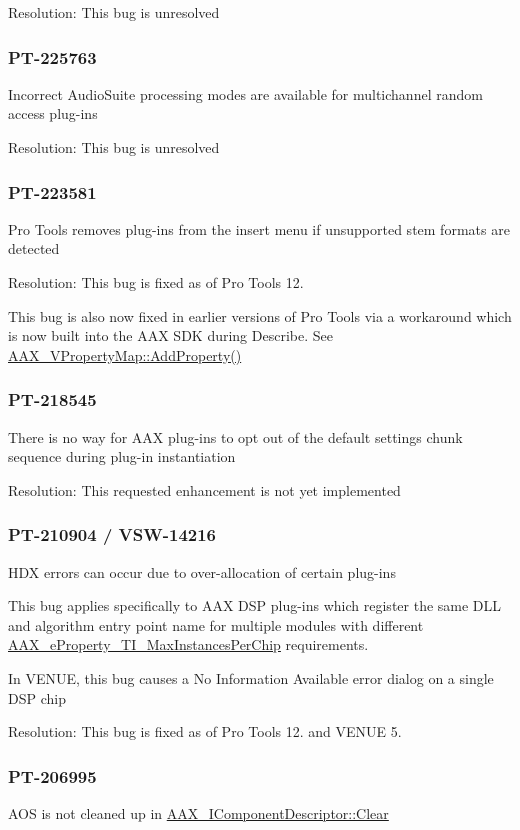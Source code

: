 Resolution\+: This bug is unresolved\hypertarget{a00374_PT-225763}{}\subsubsection{P\+T-\/225763}\label{a00374_PT-225763}
Incorrect Audio\+Suite processing modes are available for multichannel random access plug-\/ins

Resolution\+: This bug is unresolved\hypertarget{a00374_PT-223581}{}\subsubsection{P\+T-\/223581}\label{a00374_PT-223581}
Pro Tools removes plug-\/ins from the insert menu if unsupported stem formats are detected

Resolution\+: This bug is fixed as of Pro Tools 12.

This bug is also now fixed in earlier versions of Pro Tools via a workaround which is now built into the A\+A\+X S\+D\+K during Describe. See \hyperlink{a00140_ad66bb0c14572a6d550d7774a4d50ec38}{A\+A\+X\+\_\+\+V\+Property\+Map\+::\+Add\+Property()}\hypertarget{a00374_PT-218545}{}\subsubsection{P\+T-\/218545}\label{a00374_PT-218545}
There is no way for A\+A\+X plug-\/ins to opt out of the default settings chunk sequence during plug-\/in instantiation

Resolution\+: This requested enhancement is not yet implemented\hypertarget{a00374_PT-210904}{}\subsubsection{P\+T-\/210904 / V\+S\+W-\/14216}\label{a00374_PT-210904}
H\+D\+X errors can occur due to over-\/allocation of certain plug-\/ins

This bug applies specifically to A\+A\+X D\+S\+P plug-\/ins which register the same D\+L\+L and algorithm entry point name for multiple modules with different \hyperlink{a00283_a6571f4e41a5dd06e4067249228e2249ea5b85e213113b7f0f7ee4bac4f5eaa59d}{A\+A\+X\+\_\+e\+Property\+\_\+\+T\+I\+\_\+\+Max\+Instances\+Per\+Chip} requirements.

In V\+E\+N\+U\+E, this bug causes a \textquotesingle{}No Information Available\textquotesingle{} error dialog on a single D\+S\+P chip

Resolution\+: This bug is fixed as of Pro Tools 12. and V\+E\+N\+U\+E 5.\hypertarget{a00374_PT-206995}{}\subsubsection{P\+T-\/206995}\label{a00374_PT-206995}
A\+O\+S is not cleaned up in \hyperlink{a00088_a0ba6941428a6e272f72a6fadb474394f}{A\+A\+X\+\_\+\+I\+Component\+Descriptor\+::\+Clear}

